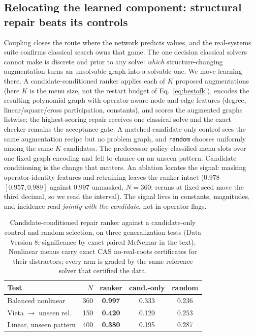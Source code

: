 \documentclass[letterpaper]{article} %
\begin{document}
\subsection{Relocating the learned component: structural repair beats its controls}
\label{sec:repair}

Coupling closes the route where the network predicts values, and the real-systems suite
confirms classical search owns that game. The one decision classical solvers cannot make
is discrete and prior to any solve: \emph{which} structure-changing augmentation turns an
unsolvable graph into a solvable one. We move learning there. A candidate-conditioned
ranker applies each of $K$ proposed augmentations (here $K$ is the menu size, not the restart
budget of Eq.~\eqref{eq:bestofk}), encodes the resulting polynomial graph with operator-aware
node and edge features (degree, linear/square/cross participation, constants), and scores the
augmented graphs listwise; the highest-scoring repair receives one classical solve and the
exact checker remains the acceptance gate. A matched candidate-only control sees the same augmentation
recipe but no problem graph, and \texttt{random} chooses uniformly among the same $K$
candidates. The predecessor policy classified menu slots over one fixed graph encoding and fell to
chance on an unseen pattern. Candidate conditioning is the change that matters.
An ablation locates the signal: masking operator-identity features and
retraining leaves the ranker intact ($0.978$ $[0.957, 0.989]$ against $0.997$ unmasked,
$N{=}360$; reruns at fixed seed move the third decimal, so we read the interval). The signal lives in constants, magnitudes, and incidence read
\emph{jointly with the candidate}, not in operator flags.

\begin{table}[t]
\centering
\caption{Candidate-conditioned repair ranker against a candidate-only control and random
selection, on three generalization tests (Data Version 8; significance by exact paired McNemar in
the text). Nonlinear menus
carry exact CAS no-real-roots certificates for their distractors; every arm is graded by the
same reference solver that certified the data.}
\label{tab:repair}
\footnotesize
\setlength{\tabcolsep}{3.5pt}
\begin{tabular}{lrccc}
\toprule
Test & $N$ & ranker & cand.-only & random \\
\midrule
Balanced nonlinear      & 360 & \textbf{0.997} & 0.333 & 0.236 \\
Vieta $\to$ unseen rel.\ & 150 & \textbf{0.420} & 0.120 & 0.253 \\
Linear, unseen pattern  & 400 & \textbf{0.380} & 0.195 & 0.287 \\
\bottomrule
\end{tabular}
\end{table}
\end{document}
